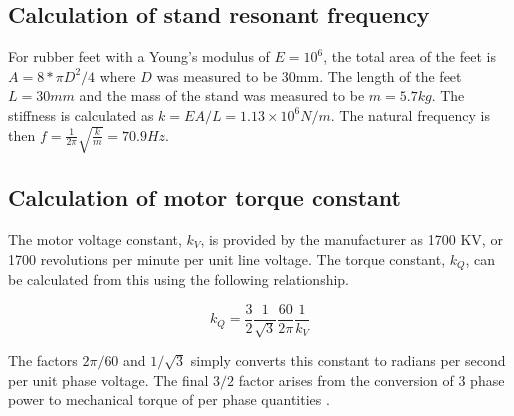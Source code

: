 \documentclass[12pt,a4paper]{article}
\begin{document}
\subsection{Calculation of stand resonant frequency \label{sec:appendix_stand_frequency}}

For rubber feet with a Young's modulus of $E = 10^6$, the total area of the feet is $A = 8 * \pi D^2/4$ where $D$ was measured to be 30mm.
The length of the feet $L=30mm$ and the mass of the stand was measured to be $m=5.7kg$.
The stiffness is calculated as $k = EA/L = 1.13 \times 10^6 N/m$.
The natural frequency is then $f = \frac{1}{2\pi} \sqrt{\frac{k}{m}} = 70.9 Hz$.


\subsection{Calculation of motor torque constant \label{sec:appendix_motor_calibration}}

The motor voltage constant, $k_V$, is provided by the manufacturer as 1700 KV, or 1700 revolutions per minute per unit line voltage.
The torque constant, $k_Q$, can be calculated from this using the following relationship.

\begin{equation}
    k_Q = \frac{3}{2} \frac{1}{\sqrt{3}} \frac{60}{2\pi} \frac{1}{k_V}
\end{equation}

The factors $2\pi/60$ and $1/\sqrt{3}$ simply converts this constant to radians per second per unit phase voltage.
The final $3/2$ factor arises from the conversion of 3 phase power to mechanical torque of per phase quantities \cite{?}.

\printbibliography
\end{document}

